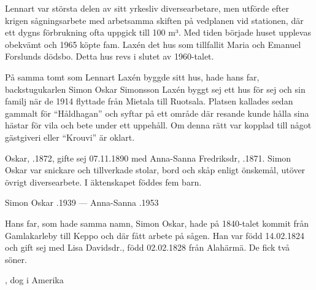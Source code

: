 Lennart var största delen av sitt yrkesliv diversearbetare, men utförde efter krigen sågningsarbete med arbetsamma skiften på vedplanen vid stationen, där ett dygns förbrukning ofta uppgick till 100 m³. Med tiden började huset upplevas obekvämt och 1965 köpte fam. Laxén det hus som tillfallit Maria och Emanuel Forslunds dödsbo. Detta hus revs i slutet av 1960-talet.


På samma tomt som Lennart Laxén byggde sitt hus, hade hans far, backstugukarlen Simon Oskar Simonsson Laxén byggt sej ett hus för sej och sin familj när de 1914 flyttade från Mietala till Ruotsala. Platsen kallades sedan gammalt för ``Håldhagan'' och syftar på ett område där resande kunde hålla sina hästar för vila och bete under ett uppehåll. Om denna rätt var kopplad till något gästgiveri eller ``Krouvi'' är oklart.

Oskar, .1872, gifte sej 07.11.1890 med Anna-Sanna Fredriksdr, .1871. Simon Oskar var snickare och tillverkade stolar, bord och skåp enligt önskemål, utöver övrigt diversearbete. I äktenskapet föddes fem barn.
\begin{jhchildren}
  \item {}
  \item {}
  \item {}
  \item {}
  \item {}
\end{jhchildren}

Simon Oskar .1939  ---  Anna-Sanna .1953

Hans far, som hade samma namn, Simon Oskar, hade på 1840-talet kommit från Gamlakarleby till Keppo och där fått arbete på sågen. Han var född 14.02.1824 och gift sej med Lisa Davidsdr., född 02.02.1828 från Alahärmä. De fick två söner.
\begin{jhchildren}
  \item {}, dog i Amerika
  \item {}
\end{jhchildren}

